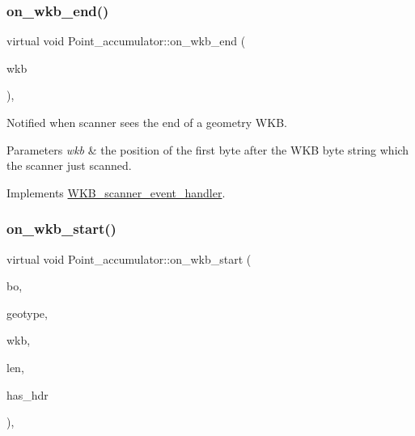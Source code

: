 \subsubsection{\texorpdfstring{on\+\_\+wkb\+\_\+end()}{on\_wkb\_end()}}
{\footnotesize\ttfamily virtual void Point\+\_\+accumulator\+::on\+\_\+wkb\+\_\+end (\begin{DoxyParamCaption}\item[{const void $\ast$}]{wkb }\end{DoxyParamCaption})\hspace{0.3cm}{\ttfamily [inline]}, {\ttfamily [virtual]}}

Notified when scanner sees the end of a geometry W\+KB. 
\begin{DoxyParams}{Parameters}
{\em wkb} & the position of the first byte after the W\+KB byte string which the scanner just scanned. \\
\hline
\end{DoxyParams}


Implements \mbox{\hyperlink{classWKB__scanner__event__handler_a07c27cceefdd31f25f1d0b3754786b78}{W\+K\+B\+\_\+scanner\+\_\+event\+\_\+handler}}.

\mbox{\label{classPoint__accumulator_a2ea2b707dbcca3fc3b891340567c7793}} 
\subsubsection{\texorpdfstring{on\+\_\+wkb\+\_\+start()}{on\_wkb\_start()}}
{\footnotesize\ttfamily virtual void Point\+\_\+accumulator\+::on\+\_\+wkb\+\_\+start (\begin{DoxyParamCaption}\item[{Geometry\+::wkb\+Byte\+Order}]{bo,  }\item[{Geometry\+::wkb\+Type}]{geotype,  }\item[{const void $\ast$}]{wkb,  }\item[{uint32}]{len,  }\item[{bool}]{has\+\_\+hdr }\end{DoxyParamCaption})\hspace{0.3cm}{\ttfamily [inline]}, {\ttfamily [virtual]}}

